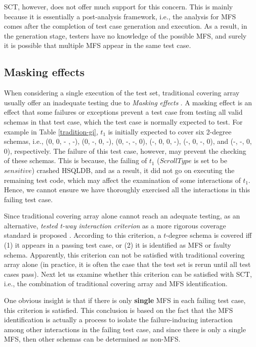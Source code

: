 \documentclass[10pt,journal,compsoc]{IEEEtran}
\begin{document}
SCT, however, does not offer much support for this concern. This is mainly because it is essentially a post-analysis framework, i.e., the analysis for MFS comes after the completion of test case generation and execution. As a result, in the generation stage, testers have no knowledge of the possible MFS, and surely it is possible that multiple MFS appear in the same test case.
%
%
\subsection{Masking effects}\label{sec:moti:mask}
 {\color{red}When considering a single execution of the test set}, traditional covering array usually offer an inadequate testing due to \emph{Masking effects} \cite{dumlu2011feedback,yilmaz2013reducing}. A masking effect\cite{yilmaz2013reducing} is an effect that some failures or exceptions prevent a test case from testing all valid schemas in that test case, which the test case is normally expected to test. For example in Table \ref{tradition-gi}, $t_{1}$ is initially expected to cover six 2-degree schemas, i.e., (0, 0, - , -), (0, -, 0, -), (0, -, -, 0), (-, 0, 0, -), (-, 0, -, 0), and (-, -, 0, 0), respectively. The failure of this test case, however, may prevent the checking of these schemas. This is because, the failing of $t_{1}$ ($Scroll Type$ is set to be $sensitive$) crashed HSQLDB, and as a result, it did not go on executing the remaining test code, which may affect the examination of some interactions of $t_{1}$. Hence, we cannot ensure we have thoroughly exercised all the interactions in this failing test case.


Since traditional covering array  {\color{red}alone} cannot reach an adequate testing, as an alternative, \emph{tested t-way interaction criterion} as a more rigorous coverage standard is proposed \cite{yilmaz2013reducing}. According to this criterion, a $t$-degree schema is covered iff (1) it appears in a passing test case, or (2) it is identified as MFS or faulty schema. Apparently, this criterion can not be satisfied with traditional covering array alone ({\color{red}in practice, it is often the case that the test set is rerun until all test cases pass}). Next let us examine whether this criterion can be satisfied with SCT, i.e., the combination of traditional covering array and MFS identification.

One obvious insight is that if there is only \textbf{single} MFS in each failing test case, this criterion is satisfied. This conclusion is based on the fact that the MFS identification is actually a process to isolate the failure-inducing interaction among other interactions in the failing test case,  and since there is only a single MFS, then other schemas can be determined as non-MFS.
\end{document}
